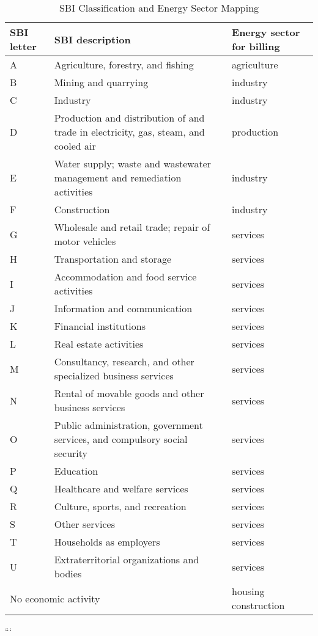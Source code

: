 \documentclass{article}
\begin{document}
\begin{table}[h!]
  \centering
  \begin{tabular}{|l|l|l|}
    \hline
    \textbf{SBI letter} & \textbf{SBI description} & \textbf{Energy sector for billing} \\
    \hline
    A & Agriculture, forestry, and fishing & agriculture \\
    B & Mining and quarrying & industry \\
    C & Industry & industry \\
    D & Production and distribution of and trade in electricity, gas, steam, and cooled air & production \\
    E & Water supply; waste and wastewater management and remediation activities & industry \\
    F & Construction & industry \\
    G & Wholesale and retail trade; repair of motor vehicles & services \\
    H & Transportation and storage & services \\
    I & Accommodation and food service activities & services \\
    J & Information and communication & services \\
    K & Financial institutions & services \\
    L & Real estate activities & services \\
    M & Consultancy, research, and other specialized business services & services \\
    N & Rental of movable goods and other business services & services \\
    O & Public administration, government services, and compulsory social security & services \\
    P & Education & services \\
    Q & Healthcare and welfare services & services \\
    R & Culture, sports, and recreation & services \\
    S & Other services & services \\
    T & Households as employers & services \\
    U & Extraterritorial organizations and bodies & services \\
    \multicolumn{2}{|l|}{No economic activity} & housing construction \\
    \hline
  \end{tabular}
  \caption{SBI Classification and Energy Sector Mapping}
\end{table}
```
\end{document}
